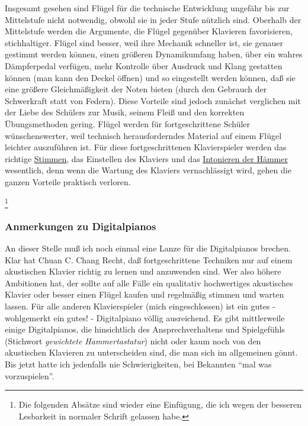 Insgesamt gesehen sind Flügel für die technische Entwicklung ungefähr bis zur Mittelstufe nicht notwendig, obwohl sie in jeder Stufe nützlich sind.
Oberhalb der Mittelstufe werden die Argumente, die Flügel gegenüber Klavieren favorisieren, stichhaltiger.
Flügel sind besser, weil ihre Mechanik schneller ist, sie genauer gestimmt werden können, einen größeren Dynamikumfang haben, über ein wahres Dämpferpedal verfügen, mehr Kontrolle über Ausdruck und Klang gestatten können (man kann den Deckel öffnen) und so eingestellt werden können, daß sie eine größere Gleichmäßigkeit der Noten bieten (durch den Gebrauch der Schwerkraft statt von Federn).
Diese Vorteile sind jedoch zunächst verglichen mit der Liebe des Schülers zur Musik, seinem Fleiß und den korrekten Übungsmethoden gering.
Flügel werden für fortgeschrittene Schüler wünschenswerter, weil technisch herausforderndes Material auf einem Flügel leichter auszuführen ist.
Für diese fortgeschrittenen Klavierspieler werden das richtige \hyperref[c2_1]{Stimmen}, das Einstellen des Klaviers und das \hyperref[c2_7_hamm]{Intonieren der Hämmer} wesentlich, denn wenn die Wartung des Klaviers vernachlässigt wird, gehen die ganzen Vorteile praktisch verloren.
 

\label{c1iii17g}
\label{digital}

\footnote{Die folgenden Absätze sind wieder eine Einfügung, die ich wegen der besseren Lesbarkeit in normaler Schrift gelassen habe.}


\subsubsection{Anmerkungen zu Digitalpianos}

An dieser Stelle muß ich noch einmal eine Lanze für die Digitalpianos brechen.
Klar hat Chuan C. Chang Recht, daß fortgeschrittene Techniken nur auf einem akustischen Klavier richtig zu lernen und anzuwenden sind.
Wer also höhere Ambitionen hat, der sollte auf alle Fälle ein qualitativ hochwertiges akustisches Klavier oder besser einen Flügel kaufen und regelmäßig stimmen und warten lassen.
Für alle anderen Klavierspieler (mich eingeschlossen) ist ein gutes - wohlgemerkt ein gutes! - Digitalpiano völlig ausreichend.
Es gibt mittlerweile einige Digitalpianos, die hinsichtlich des Ansprechverhaltens und Spielgefühls (Stichwort \textit{gewichtete Hammertastatur}) nicht oder kaum noch von den akustischen Klavieren zu unterscheiden sind, die man sich im allgemeinen gönnt.
Bis jetzt hatte ich jedenfalls nie Schwierigkeiten, bei Bekannten \enquote{mal was vorzuspielen}.

